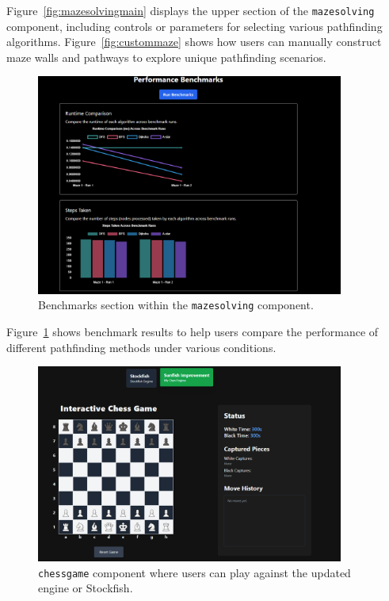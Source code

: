 \documentclass[12pt,a4paper]{article}
\begin{document}
\noindent
Figure~\ref{fig:mazesolvingmain} displays the upper section of the \texttt{mazesolving} 
component, including controls or parameters for selecting various pathfinding algorithms.  
Figure~\ref{fig:custommaze} shows how users can manually construct maze walls and pathways 
to explore unique pathfinding scenarios.

\FloatBarrier
\begin{figure}[htbp]
  \centering
  \includegraphics[width=0.9\textwidth]{figures/Benchmarks.png}
  \caption{Benchmarks section within the \texttt{mazesolving} component.}
  \label{fig:benchmarks}
\end{figure}

\noindent
Figure~\ref{fig:benchmarks} shows benchmark results to help users compare the 
performance of different pathfinding methods under various conditions.

\FloatBarrier
\begin{figure}[htbp]
  \centering
  \includegraphics[width=0.9\textwidth]{figures/Chessplay.png}
  \caption{\texttt{chessgame} component where users can play against the updated engine or Stockfish.}
  \label{fig:chessplay}
\end{figure}
\end{document}
